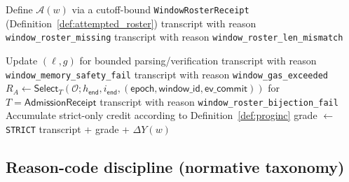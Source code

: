 \documentclass[11pt]{article}
\newcommand{\code}[1]{\texttt{#1}}
\newcommand{\1}{\mathbf{1}}
\theoremstyle{definition}
\theoremstyle{plain}
\begin{document}
\begin{algorithm}[H]
\begin{algorithmic}[1]
  \State Define $\mathcal{A}(w)$ via a cutoff-bound \code{WindowRosterReceipt} (Definition~\ref{def:attempted_roster})
   \Return transcript with reason \code{window\_roster\_missing} \EndIf
   \Return transcript with reason \code{window\_roster\_len\_mismatch} \EndIf

  \State {}
     \State Update $(\ell,g)$ for bounded parsing/verification
      \Return transcript with reason \code{window\_memory\_safety\_fail} \EndIf
      \Return transcript with reason \code{window\_gas\_exceeded} \EndIf
      \State $R_A \gets \mathsf{Select}_T(\mathcal{O};h_{\textsf{end}},i_{\textsf{end}},(\textsf{epoch},\textsf{window\_id},\textsf{ev\_commit}))$ for $T=\textsf{AdmissionReceipt}$
       \Return transcript with reason \code{window\_roster\_bijection\_fail} \EndIf
      \State Accumulate strict-only credit according to Definition~\ref{def:proginc}
  \EndFor
  \State grade $\gets$ \texttt{STRICT}
  \State \Return transcript + grade + $\Delta Y(w)$
\EndProcedure
\end{algorithmic}
\end{algorithm}

\subsection{Reason-code discipline (normative taxonomy)}
\label{sec:reasons}
\end{document}
